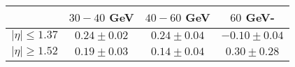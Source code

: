 \centering
\begin{tabular}{|c|c|c|c|} \hline
 & $30-40$ GeV & $40-60$ GeV & $60$ GeV-\\\hline
$\lvert \eta \rvert \leq 1.37$ & $0.24\pm0.02$ & $0.24\pm0.04$ & $-0.10\pm0.04$\\\hline
$\lvert \eta \rvert \geq 1.52$ & $0.19\pm0.03$ & $0.14\pm0.04$ & $0.30\pm0.28$\\\hline
\end{tabular}
